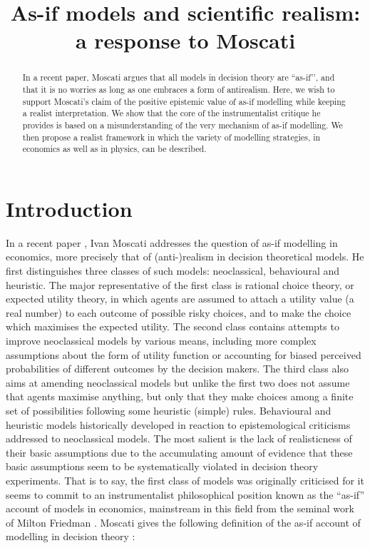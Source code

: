 \documentclass[a4paper,11pt]{article}
\title{As-if models and scientific realism: a response to Moscati}
\theoremstyle{definition}
\begin{document}
\maketitle

\begin{abstract}
   In a recent paper, Moscati argues that all models in decision theory are ``as-if’’, and that it is no worries as long as one embraces a form of antirealism. Here, we wish to support Moscati’s claim of the positive epistemic value of as-if modelling while keeping a realist interpretation. We show that the core of the instrumentalist critique he provides is based on a misunderstanding of the very mechanism of as-if modelling. We then propose a realist framework in which the variety of modelling strategies, in economics as well as in physics, can be described.
\end{abstract}


\section{Introduction}

In a recent paper \citep{Moscati2023}, Ivan Moscati addresses the question of as-if modelling in economics, more precisely that of (anti-)realism in decision theoretical models. He first distinguishes three classes of such models: neoclassical, behavioural and heuristic. The major representative of the first class is rational choice theory, or expected utility theory, in which agents are assumed to attach a utility value (a real number) to each outcome of possible risky choices, and to make the choice which maximises the expected utility. The second class contains attempts to improve neoclassical models by various means, including more complex assumptions about the form of utility function or accounting for biased perceived probabilities of different outcomes by the decision makers. The third class also aims at amending neoclassical models but unlike the first two does not assume that agents maximise anything, but only that they make choices among a finite set of possibilities following some heuristic (simple) rules. Behavioural and heuristic models historically developed in reaction to epistemological criticisms addressed to neoclassical models. The most salient is the lack of realisticness of their basic assumptions due to the accumulating amount of evidence that these basic assumptions seem to be systematically violated in decision theory experiments. That is to say, the first class of models was originally criticised for it seems to commit to an instrumentalist philosophical position known as the ``as-if'' account of models in economics, mainstream in this field from the seminal work of Milton Friedman \cite{Friedman1953}. Moscati gives the following definition of the as-if account of modelling in decision theory \citep[p. 2]{Moscati2023}: 
\end{document}
